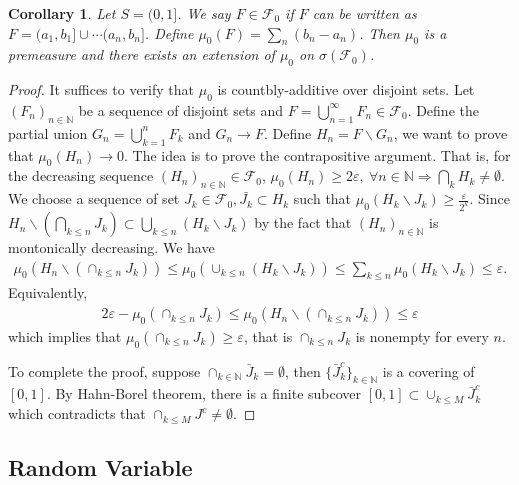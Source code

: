 \documentclass[11pt,english]{smfart}
\newtheorem{corollary}[theorem]{Corollary}
\newcommand{\mb}{\mathbb}
\newcommand{\mc}{\mathcal}
\begin{document}
\begin{corollary}
    Let $S = (0,1]$. We say $F \in \mc{F}_0$ if $F$ can be written as $F = (a_1,b_1] \cup \cdots (a_n,b_n]$. Define $\mu_0(F) = \sum_{n} (b_n - a_n)$. Then $\mu_0$ is a premeasure and there exists an extension of $\mu_0$ on $\sigma(\mc{F}_0)$. 
\end{corollary}
\begin{proof}
    It suffices to verify that $\mu_0$ is countbly-additive over disjoint sets. Let $(F_n)_{n\in \mb{N}}$ be a sequence of disjoint sets and $F = \bigcup_{n=1}^\infty F_n \in \mc{F}_0$. Define the partial union $G_n = \bigcup_{k=1}^n F_k$ and $G_n \rightarrow F$. Define $H_n = F\backslash G_n$, we want to prove that $\mu_0(H_n) \rightarrow 0$. The idea is to prove the contrapositive argument. That is, for the decreasing sequence $(H_n)_{n\in \mb{N}} \in \mc{F}_0$, $\mu_0(H_n) \geq 2\varepsilon,\  \forall n\in \mb{N}\Rightarrow \bigcap_{k} H_k \neq \emptyset$. We choose a sequence of set $J_k \in \mc{F}_0, \bar{J_k} \subset H_k$ such that $\mu_0(H_k \backslash J_k) \geq \frac{\varepsilon}{2^k} $. Since $H_n \backslash \left(\bigcap_{k\leq n} J_k \right) \subset  \bigcup_{k\leq n} \left(H_k \backslash J_k\right)$ by the fact that $(H_n)_{n\in \mb{N}}$ is montonically decreasing. We have \begin{align*}
        \mu_0\left(H_n \backslash \left(\cap_{k\leq n} J_k \right)\right) \leq \mu_0 \left(\cup_{k\leq n} \left(H_k \backslash J_k\right)\right) \leq \sum_{k\leq n} \mu_0\left(H_k \backslash J_k\right) \leq \varepsilon.
    \end{align*}
    Equivalently, \begin{align*}
        2\varepsilon - \mu_0 \left(\cap_{k\leq n} J_k\right) \leq  \mu_0\left(H_n \backslash \left(\cap_{k\leq n} J_k \right) \right)
        \leq \varepsilon
    \end{align*}
    which implies that $\mu_0\left( \cap_{k\leq n} J_k\right) \geq \varepsilon$, that is $\cap_{k\leq n} J_k$ is nonempty for every $n$. 

    To complete the proof, suppose $\cap_{k\in \mb{N}} \bar{J}_k = \emptyset$, then $\{\bar{J}_k^c\}_{k\in \mb{N}} $ is a covering of $[0,1]$. By Hahn-Borel theorem, there is a finite subcover $[0,1] \subset \cup_{k\leq M} \bar{J}_k^c$ which contradicts that $\cap_{k\leq M} J^c \neq \emptyset$.
\end{proof}


\subsection{Random Variable}
\end{document}
